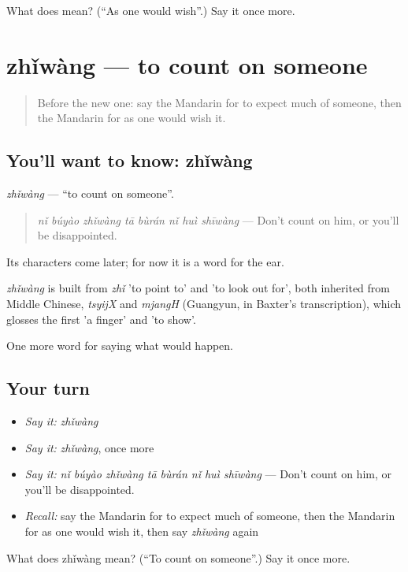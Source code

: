 \begin{tcolorbox}[breakable,colback=teal!4,colframe=teal!35!black,title={Before you move on}]
What does  mean? (\textquotedblleft{}As one would wish\textquotedblright{}.) Say it once more.
\end{tcolorbox}
\section[zhǐwàng]{zhǐwàng — to count on someone}

\label{lesson:ZH-C532-zhiwang}



\begin{quote}
Before the new one: say the Mandarin for to expect much of someone, then the Mandarin for as one would wish it.
\end{quote}

\subsection*{You'll want to know: zhǐwàng}
\emph{zhǐwàng} — \textquotedblleft{}to count on someone\textquotedblright{}.

\begin{quote}
\emph{nǐ búyào zhǐwàng tā bùrán nǐ huì shīwàng} — Don't count on him, or you'll be disappointed.
\end{quote}

Its characters come later; for now it is a word for the ear.

\begin{cousinweb}
\emph{zhǐwàng} is built from \emph{zhǐ} 'to point to' and  'to look out for', both inherited from Middle Chinese, \emph{tsyijX} and \emph{mjangH} (Guangyun, in Baxter's transcription), which glosses the first 'a finger' and 'to show'.
\end{cousinweb}

\begin{grammarlens}[title={What you've built}]
One more word for saying what would happen.
\end{grammarlens}

\subsection*{Your turn}
\begin{itemize}
\raggedright
  \item \emph{Say it:} \emph{zhǐwàng}
  \item \emph{Say it:} \emph{zhǐwàng}, once more
  \item \emph{Say it:} \emph{nǐ búyào zhǐwàng tā bùrán nǐ huì shīwàng} — Don't count on him, or you'll be disappointed.
  \item \emph{Recall:} say the Mandarin for to expect much of someone, then the Mandarin for as one would wish it, then say \emph{zhǐwàng} again
\end{itemize}

\begin{tcolorbox}[breakable,colback=teal!4,colframe=teal!35!black,title={Before you move on}]
What does zhǐwàng mean? (\textquotedblleft{}To count on someone\textquotedblright{}.) Say it once more.
\end{tcolorbox}
